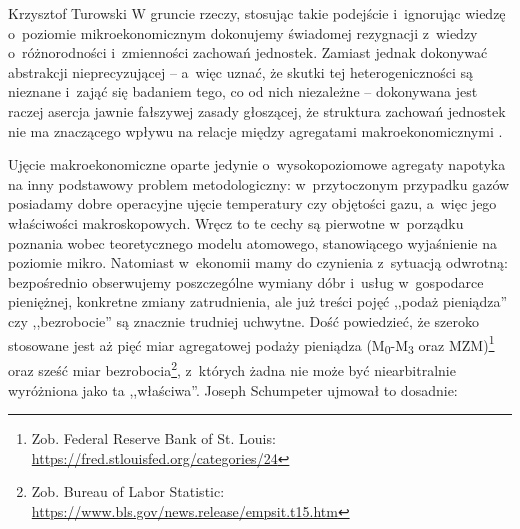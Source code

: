\begin{artplenv}{Krzysztof Turowski}
W gruncie rzeczy, stosując takie podejście i~ignorując wiedzę o~poziomie mikroekonomicznym dokonujemy świadomej
rezygnacji z~wiedzy o~różnorodności i~zmienności zachowań jednostek. Zamiast jednak dokonywać abstrakcji
nieprecyzującej  --  a~więc uznać, że skutki tej heterogeniczności są nieznane i~zająć się badaniem tego, co od
nich niezależne  --  dokonywana jest raczej asercja jawnie fałszywej zasady głoszącej, że struktura zachowań
jednostek nie ma znaczącego wpływu na relacje między agregatami makroekonomicznymi
\parencite{long_realism_2006}.

Ujęcie makroekonomiczne oparte jedynie o~wysokopoziomowe agregaty napotyka na inny podstawowy problem
metodologiczny: w~przytoczonym przypadku gazów posiadamy dobre operacyjne ujęcie temperatury czy objętości
gazu, a~więc jego właściwości
makroskopowych. Wręcz to te cechy są pierwotne w~porządku poznania wobec teoretycznego modelu atomowego, stanowiącego
wyjaśnienie na poziomie mikro. Natomiast w~ekonomii mamy do czynienia z~sytuacją odwrotną: bezpośrednio obserwujemy
poszczególne wymiany dóbr i~usług w~gospodarce pieniężnej, konkretne zmiany zatrudnienia, ale już treści pojęć ,,podaż
pieniądza'' czy ,,bezrobocie'' są znacznie trudniej uchwytne. Dość powiedzieć, że szeroko stosowane jest aż pięć
miar agregatowej podaży pieniądza (M\textsubscript{0}{}-M\textsubscript{3} oraz MZM)\footnote{Zob. Federal Reserve Bank
of St. Louis: \url{https://fred.stlouisfed.org/categories/24}} oraz sześć miar bezrobocia\footnote{Zob. Bureau of Labor
Statistic: \url{https://www.bls.gov/news.release/empsit.t15.htm}}, z~których żadna nie może być niearbitralnie
wyróżniona jako ta ,,właściwa''. Joseph Schumpeter
\parencite*{schumpeter_nature_2010}
ujmował to dosadnie:



\end{artplenv}
